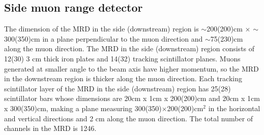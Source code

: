 \subsection{Side muon range detector}
The dimension of the MRD in the side (downstream) region is
$\sim$200(200)cm $\times$ $\sim$300(350)cm in a plane perpendicular to the muon direction
and $\sim$75(230)cm along the muon direction.
The MRD in the side (downstream) region consists of 12(30) 3 cm thick iron plates and 14(32) tracking scintillator planes.
Muons generated at smaller angle to the beam axis have higher momentum,
so the MRD in the downstream region is thicker along the muon direction.
Each tracking scintillator layer of the MRD in the side (downstream) region
has 25(28) scintillator bars whose dimensions are 20cm x 1cm x 200(200)cm and 20cm x 1cm x 300(350)cm,
making a plane measuring 300(350)$\times$200(200)cm$^{2}$ in the horizontal and vertical directions and 2 cm along the muon direction.
The total number of channels in the MRD is 1246.

